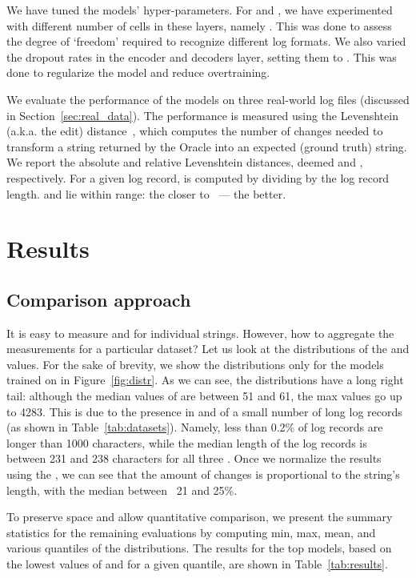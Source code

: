 \documentclass{article}
\begin{document}
We have tuned the models' hyper-parameters. For  and , we have experimented with different number of cells in these layers, namely . This was done to assess the degree of `freedom' required to recognize different log formats. We also varied the dropout rates in the encoder and decoders layer, setting them to . This was done to regularize the model and reduce overtraining.

We evaluate the performance of the models on three real-world log files (discussed in Section~\ref{sec:real_data}). The performance is measured using the Levenshtein (a.k.a. the edit) distance~\cite{levenshtein1966binary}, which computes the number of changes needed to transform a string returned by the Oracle into an expected (ground truth) string. 
We report the absolute and relative Levenshtein distances, deemed  and , respectively. For a given log record,  is computed by dividing  by the log record length.  and  lie within  range: the closer to ~--- the better. 

\section{Results} \label{sec:results}

\subsection{Comparison approach}
It is easy to measure  and  for individual strings. However, how to aggregate the measurements for a particular  dataset? Let us look at the distributions of the  and  values. For the sake of brevity, we show the distributions only for the models trained on  in Figure~\ref{fig:distr}. As we can see, the distributions have a long right tail: although the median values of  are between 51 and 61, the max values go up to 4283. This is due to the presence in  and  of a small number of long log records (as shown in Table~\ref{tab:datasets}). Namely, less than  0.2\% of log records are longer than 1000 characters, while the median length of the log records is between 231 and 238 characters for all three . 
Once we normalize the results using the  , we can see that the amount of changes is proportional to the string’s length, with the median  between ~21 and 25\%.

To preserve space and allow quantitative comparison, we present the summary statistics for the remaining evaluations by computing min, max, mean, and various quantiles of the distributions. The results for the top models, based on the lowest values of  and  for a given quantile, are shown in Table~\ref{tab:results}.
\end{document}

